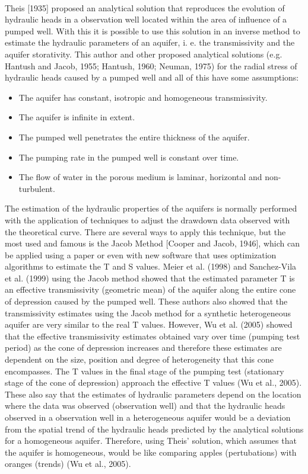 \documentclass[11pt, a4paper]{article}
\begin{document}
    \paragraph{} %
    Theis [1935] proposed an analytical solution that reproduces the evolution of hydraulic heads in a observation well located within the area of influence of a pumped well. With this it is possible to use this solution in an inverse method to estimate the hydraulic parameters of an aquifer, i. e. the transmissivity and the aquifer storativity. This author and other proposed analytical solutions (e.g. Hantush and Jacob, 1955; Hantush, 1960; Neuman, 1975) for the radial stress of hydraulic heads caused by a pumped well and all of this have some assumptions:
    \begin{itemize}
        \item The aquifer has constant, isotropic and homogeneous transmissivity.
        \item The aquifer is infinite in extent.
        \item The pumped well penetrates the entire thickness of the aquifer.
        \item The pumping rate in the pumped well is constant over time.
        \item The flow of water in the porous medium is laminar, horizontal and non-turbulent.
    \end{itemize}
    The estimation of the hydraulic properties of the aquifers is normally performed with the application of techniques to adjust the drawdown data observed with the theoretical curve. There are several ways to apply this technique, but the most used and famous is the Jacob Method [Cooper and Jacob, 1946], which can be applied using a paper or even with new software that uses optimization algorithms to estimate the T and S values. Meier et al. (1998) and Sanchez-Vila et al. (1999) using the Jacob method showed that the estimated parameter T is an effective transmissivity (geometric mean) of the aquifer along the entire cone of depression caused by the pumped well. These authors also showed that the transmissivity estimates using the Jacob method for a synthetic heterogeneous aquifer are very similar to the real T values. However, Wu et al. (2005) showed that the effective transmissivity estimates obtained vary over time (pumping test period) as the cone of depression increases and therefore these estimates are dependent on the size, position and degree of heterogeneity that this cone encompasses. The T values in the final stage of the pumping test (stationary stage of the cone of depression) approach the effective T values (Wu et al., 2005). These also say that the estimates of hydraulic parameters depend on the location where the data was observed (observation well) and that the hydraulic heads observed in a observation well in a heterogeneous aquifer would be a deviation from the spatial trend of the hydraulic heads predicted by the analytical solutions for a homogeneous aquifer. Therefore, using Theis' solution, which assumes that the aquifer is homogeneous, would be like comparing apples (pertubations) with oranges (trends) (Wu et al., 2005).
\end{document}
